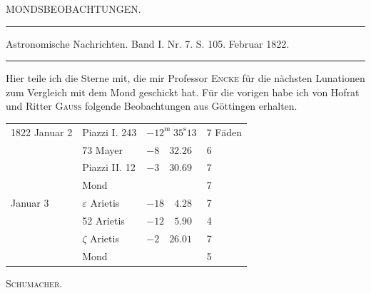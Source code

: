 \clearpage
{}
\begin{center}
{\large MONDSBEOBACHTUNGEN.}

\noindent\rule{\linewidth}{0.4pt}

Astronomische Nachrichten. Band I. Nr. 7. S. 105. Februar 1822.

\noindent\rule{\linewidth}{0.4pt}
\end{center}

Hier teile ich die Sterne mit, die mir Professor \textsc{Encke} für die nächsten Lunationen zum Vergleich mit dem Mond geschickt hat. Für die vorigen habe ich von Hofrat und Ritter \textsc{Gauss} folgende Beobachtungen aus Göttingen erhalten.

\begin{center}
\begin{tabular}{l|l|l|l}
1822 Januar 2 & Piazzi I. 243 & $-12^{\mathrm{m}}\;35^{\mathrm{s}}13$ & 7 Fäden \\
 & 73 Mayer & $-8\quad32.26$ & 6 \\
 & Piazzi II. 12 & $-3\quad30.69$ & 7 \\
 & Mond & & 7 \\
Januar 3 & $\varepsilon$ Arietis & $-18\quad4.28$ & 7 \\
 & 52 Arietis & $-12\quad5.90$ & 4 \\
 & $\zeta$ Arietis & $-2\quad26.01$ & 7 \\
 & Mond & & 5 \\
\end{tabular}
\end{center}

\begin{flushright}
\textsc{Schumacher}.
\end{flushright}

